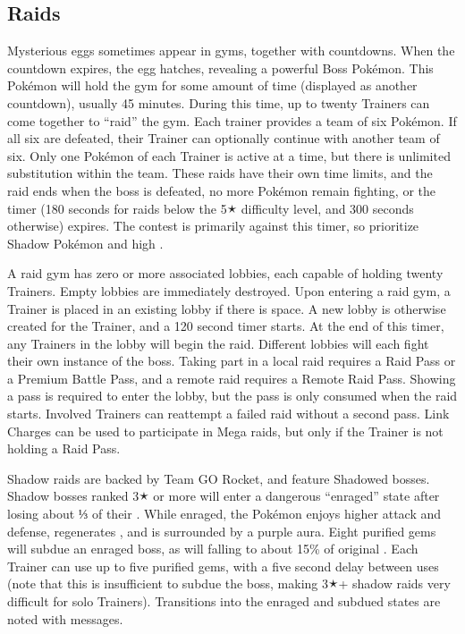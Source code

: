 \subsection{Raids\label{sec:raids}}
Mysterious eggs sometimes appear in gyms, together with countdowns.
When the countdown expires, the egg hatches, revealing a powerful Boss Pokémon.
This Pokémon will hold the gym for some amount of time (displayed as another countdown), usually 45 minutes.
During this time, up to twenty Trainers can come together to ``raid'' the gym.
Each trainer provides a team of six Pokémon.
If all six are defeated, their Trainer can optionally continue with another team of six.
Only one Pokémon of each Trainer is active at a time, but there is unlimited substitution within the team.
These raids have their own time limits, and the raid ends when the boss is defeated, no more Pokémon remain fighting,
  or the timer (180 seconds for raids below the 5🟉 difficulty level, and 300 seconds otherwise) expires.
The contest is primarily against this timer, so prioritize Shadow Pokémon and high .

A raid gym has zero or more associated lobbies, each capable of holding twenty Trainers.
Empty lobbies are immediately destroyed.
Upon entering a raid gym, a Trainer is placed in an existing lobby if there is space.
A new lobby is otherwise created for the Trainer, and a 120 second timer starts.
At the end of this timer, any Trainers in the lobby will begin the raid.
Different lobbies will each fight their own instance of the boss.
Taking part in a local raid requires a Raid Pass or a Premium Battle Pass,
  and a remote raid requires a Remote Raid Pass.
Showing a pass is required to enter the lobby, but the pass is only consumed when the raid starts.
Involved Trainers can reattempt a failed raid without a second pass.
Link Charges can be used to participate in Mega raids, but only if the
  Trainer is not holding a Raid Pass.

Shadow raids are backed by Team GO Rocket, and feature Shadowed bosses.
Shadow bosses ranked 3🟉 or more will enter a dangerous ``enraged'' state after losing about ⅓ of their \HP\@.
While enraged, the Pokémon enjoys higher attack and defense, regenerates \HP, and is surrounded by a purple aura.
Eight purified gems will subdue an enraged boss, as will falling to about 15\% of original \HP\@.
Each Trainer can use up to five purified gems, with a five second delay between uses
 (note that this is insufficient to subdue the boss, making 3🟉+ shadow raids
 very difficult for solo Trainers).
Transitions into the enraged and subdued states are noted with messages.


